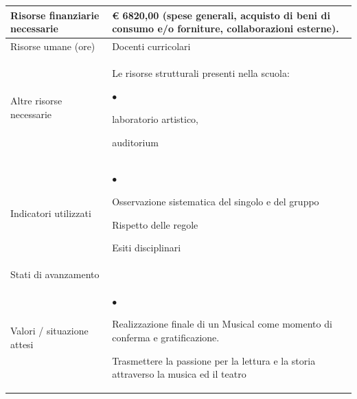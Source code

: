 \documentclass[12pt,a4paper,oneside]{memoir}
\newenvironment{elenco}{\begin{list}{$\bullet$}{%
              \setlength{\leftmargin}{4mm}%
              \setlength{\rightmargin}{1mm}%
               \setlength{\itemindent}{0mm}%
               \setlength{\labelwidth}{2mm}%
               \setlength{\labelsep}{2mm}%
              \setlength{\itemsep}{-\parsep}%
              \setlength{\partopsep}{0pt}%
              \setlength{\topsep}{0pt}%
             \setlength{\parskip}{0pt}%
              }}{\end{list}}
\begin{document}
\begin{footnotesize}
\begin{longtable}{|>{\raggedright}p{2.5cm}|>{\raggedright\arraybackslash}P{10cm}|}
Risorse finanziarie necessarie&€ 6820,00 (spese generali, acquisto di beni di consumo e/o forniture, collaborazioni esterne).\\ \hline
Risorse umane (ore)&Docenti curricolari\\ \hline
Altre risorse necessarie&Le risorse strutturali presenti nella scuola:
\begin{elenco}
\item laboratorio artistico,
\item auditorium
\end{elenco}\\ \hline
Indicatori utilizzati&
\begin{elenco}
\item Osservazione sistematica del singolo e del gruppo
\item Rispetto delle regole
\item Esiti disciplinari
\end{elenco}\\[-4mm] \hline
Stati di avanzamento&\\ \hline
Valori / situazione attesi&
\begin{elenco}
\item Realizzazione finale di un Musical come momento di conferma e gratificazione.
\item Trasmettere la passione per la lettura e la storia attraverso la musica ed il teatro
\end{elenco}\\ \hline
\end{longtable}
\end{footnotesize}

\vspace{24pt}
\end{document}
